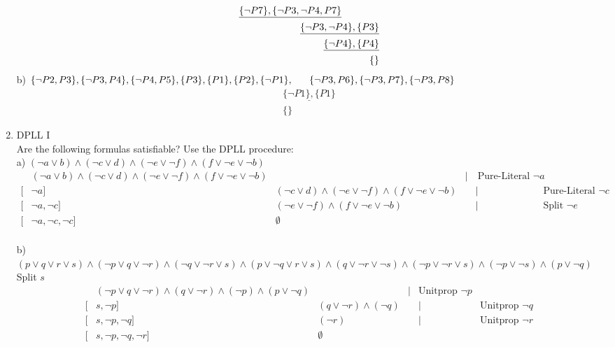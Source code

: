 \documentclass[a4paper,twoside,12pt]{article}
\newcounter{AUFGNR}
\newcommand{\AUFGABE}[1]{\vspace{0.3cm}\item[Exercise~{\arabic{AUFGNR}}:]\stepcounter{AUFGNR} #1\\[1ex]}
\begin{document}
\begin{enumerate}[wide=-0.2cm]
\begin{align*}
		\underline{\{\neg P7\}, \{\neg P3, \neg P4, P7\}} \hspace{1.35cm} \\
	 	\underline{\{\neg P3, \neg P4\}, \{P3\}} \\
	 	\underline{\{\neg P4\}, \{P4\}} \\
	 \{\}
	\end{align*}
	b) $\{\neg P2, P3\}, \{\neg P3, P4\}, \{\neg P4, P5\}, \{P3\}, \{P1\}, \{P2\}, \{\neg P1\},\\
	~~~~~ \{\neg P3, P6\}, \{\neg P3, P7\},	\{\neg P3, P8\}$
	\begin{align*}
		\underline{\{\neg P1\}, \{P1\}} \\
		\{\}
	\end{align*}
	\AUFGABE{DPLL I}
	Are the following formulas satisfiable? Use the DPLL procedure:\\
	a) $(\neg  a \vee b) \wedge (\neg c \vee d) \wedge (\neg e \vee \neg f) \wedge (f \vee \neg e \vee \neg b)$\\
	\begin{align*} 
		[&]& (\neg  a \vee b) \wedge (\neg c \vee d) \wedge (\neg e \vee \neg f) \wedge (f \vee \neg e \vee \neg b)  &&|&~\text{Pure-Literal } \neg a\\
		[&\neg a]& (\neg c \vee d) \wedge (\neg e \vee \neg f) \wedge (f \vee \neg e \vee \neg b) &&|&~\text{Pure-Literal } \neg c\\
		[&\neg a, \neg c]& (\neg e \vee \neg f) \wedge (f \vee \neg e \vee \neg b) &&|&~\text{Split } \neg e\\
		[&\neg a, \neg c, \neg c]& \emptyset &&&\\
	\end{align*}

	b) $(p \vee q \vee r \vee s) \wedge (\neg p \vee q \vee \neg r) \wedge (\neg q \vee \neg r \vee s) \wedge (p \vee \neg q \vee r \vee s) \wedge (q \vee \neg r \vee \neg s) \wedge	(\neg p \vee \neg r \vee s) \wedge (\neg p \vee \neg s) \wedge (p \vee \neg q)$ Split $s$
	\begin{align*} 
	[&s]& (\neg p \vee q \vee \neg r) \wedge (q \vee \neg r )  \wedge (\neg p) \wedge (p \vee \neg q) &&|& \text{Unitprop } \neg p\\
	[&s, \neg p]& (q \vee \neg r ) \wedge (\neg q) &&|& \text{Unitprop } \neg q\\
	[&s, \neg p, \neg q]& ( \neg r ) &&|& \text{Unitprop } \neg r\\
	[&s, \neg p, \neg q, \neg r]& \emptyset\\
	\end{align*}
	

\end{enumerate}
\end{document}
